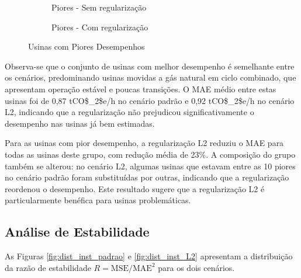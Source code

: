 \begin{figure}[H]
    \centering
    \begin{subfigure}{0.6\textwidth}
        \centering
        
        \caption{Piores - Sem regularização}
        \label{fig:piores_padrao}
    \end{subfigure}
    
    \vspace{0.5cm}
    
    \begin{subfigure}{0.6\textwidth}
        \centering
        
        \caption{Piores - Com regularização}
        \label{fig:piores_l2}
    \end{subfigure}
    \caption{Usinas com Piores Desempenhos}
    \label{fig:piores}
\end{figure}

Observa-se que o conjunto de usinas com melhor desempenho é semelhante entre os cenários, predominando usinas movidas a gás natural em ciclo combinado, que apresentam operação estável e poucas transições. O \ac{MAE} médio entre estas usinas foi de 0,87 \ac{tCO$_2$e}/h no cenário padrão e 0,92 \ac{tCO$_2$e}/h no cenário L2, indicando que a regularização não prejudicou significativamente o desempenho nas usinas já bem estimadas.

Para as usinas com pior desempenho, a regularização L2 reduziu o \ac{MAE} para todas as usinas deste grupo, com redução média de 23\%. A composição do grupo também se alterou: no cenário L2, algumas usinas que estavam entre as 10 piores no cenário padrão foram substituídas por outras, indicando que a regularização reordenou o desempenho. Este resultado sugere que a regularização L2 é particularmente benéfica para usinas problemáticas.

\subsection{Análise de Estabilidade}

As Figuras \ref{fig:dist_inst_padrao} e \ref{fig:dist_inst_L2} apresentam a distribuição da razão de estabilidade \(R = \text{MSE} / \text{MAE}^2\) para os dois cenários.

